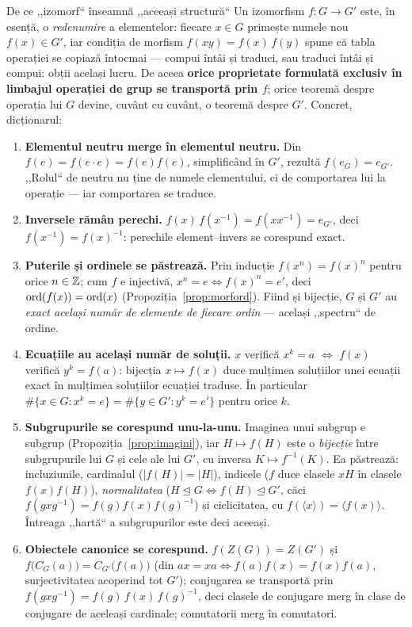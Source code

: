 \begin{tehbox}{De ce ,,izomorf`` înseamnă ,,aceeași structură``}
Un izomorfism $f:G\to G'$ este, în esență, o \emph{redenumire} a elementelor: fiecare $x\in G$ primește numele nou $f(x)\in G'$, iar condiția de morfism $f(xy)=f(x)\,f(y)$ spune că tabla operației se copiază întocmai --- compui întâi și traduci, sau traduci întâi și compui: obții același lucru. De aceea \textbf{orice proprietate formulată exclusiv în limbajul operației de grup se transportă prin $f$}; orice teoremă despre operația lui $G$ devine, cuvânt cu cuvânt, o teoremă despre $G'$. Concret, dicționarul:
\begin{enumerate}[leftmargin=*, itemsep=1pt]
\item \textbf{Elementul neutru merge în elementul neutru.} Din $f(e)=f(e\cdot e)=f(e)f(e)$, simplificând în $G'$, rezultă $f(e_G)=e_{G'}$. ,,Rolul`` de neutru nu ține de numele elementului, ci de comportarea lui la operație --- iar comportarea se traduce.
\item \textbf{Inversele rămân perechi.} $f(x)\,f(x^{-1})=f(xx^{-1})=e_{G'}$, deci $f(x^{-1})=f(x)^{-1}$: perechile element--invers se corespund exact.
\item \textbf{Puterile și ordinele se păstrează.} Prin inducție $f(x^n)=f(x)^n$ pentru orice $n\in\mathbb{Z}$; cum $f$ e injectivă, $x^n=e\iff f(x)^n=e'$, deci $\operatorname{ord}(f(x))=\operatorname{ord}(x)$ (Propoziția~\ref{prop:morford}). Fiind și bijecție, $G$ și $G'$ au \emph{exact același număr de elemente de fiecare ordin} --- același ,,spectru`` de ordine.
\item \textbf{Ecuațiile au același număr de soluții.} $x$ verifică $x^k=a$ $\iff$ $f(x)$ verifică $y^k=f(a)$: bijecția $x\mapsto f(x)$ duce mulțimea soluțiilor unei ecuații exact în mulțimea soluțiilor ecuației traduse. În particular $\#\{x\in G:x^k=e\}=\#\{y\in G':y^k=e'\}$ pentru orice $k$.
\item \textbf{Subgrupurile se corespund unu-la-unu.} Imaginea unui subgrup e subgrup (Propoziția~\ref{prop:imagini}), iar $H\mapsto f(H)$ este o \emph{bijecție} între subgrupurile lui $G$ și cele ale lui $G'$, cu inversa $K\mapsto f^{-1}(K)$. Ea păstrează: incluziunile, cardinalul ($|f(H)|=|H|$), indicele ($f$ duce clasele $xH$ în clasele $f(x)f(H)$), \emph{normalitatea} ($H\trianglelefteq G\iff f(H)\trianglelefteq G'$, căci $f(gxg^{-1})=f(g)f(x)f(g)^{-1}$) și ciclicitatea, cu $f(\langle x\rangle)=\langle f(x)\rangle$. Întreaga ,,hartă`` a subgrupurilor este deci aceeași.
\item \textbf{Obiectele canonice se corespund.} $f(Z(G))=Z(G')$ și $f\big(C_G(a)\big)=C_{G'}\big(f(a)\big)$ (din $ax=xa\iff f(a)f(x)=f(x)f(a)$, surjectivitatea acoperind tot $G'$); conjugarea se transportă prin $f(gxg^{-1})=f(g)\,f(x)\,f(g)^{-1}$, deci clasele de conjugare merg în clase de conjugare de aceleași cardinale; comutatorii merg în comutatori.

\end{enumerate}
\end{tehbox}

